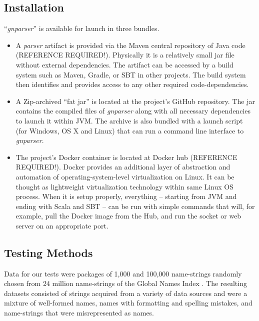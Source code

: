 \documentclass{bmcart}
\begin{document}
\subsection*{Installation}

``\textit{gnparser}'' is available for launch in three bundles.

\begin{itemize}
  \item A \textit{parser} artifact is provided via the Maven central repository of
    Java code (REFERENCE REQUIRED!). Physically it is a relatively small jar file without
    external dependencies. The artifact can be accessed by a build system such
    as Maven, Gradle, or SBT in other projects. The build system then
    identifies and provides access to any other required code-dependencies.

  \item A Zip-archived ``fat jar'' is located at the project's GitHub
    repository.  The jar contains the compiled files of \textit{gnparser} along
    with all necessary dependencies to launch it within JVM. The archive is
    also bundled with a launch script (for Windows, OS X and Linux) that can
    run a command line interface to \textit{gnparser}.

  \item The project's Docker container is located at Docker hub  (REFERENCE REQUIRED!).
    Docker provides an additional layer of abstraction and automation of
    operating-system-level virtualization on Linux. It can be thought as
    lightweight virtualization technology within same Linux OS process. When it
    is setup properly, everything -- starting from JVM and ending with Scala
    and SBT -- can be run with simple commands that will, for example,  pull
    the Docker image from the Hub, and run the socket or web server on an appropriate port.

\end{itemize}

\subsection*{Testing Methods}

Data for our tests were packages of 1,000 and 100,000 name-strings randomly chosen from
24 million name-strings of the Global Names Index \cite{gn:index}. The 
resulting datasets consisted of strings acquired from a variety of data sources
and were a mixture of well-formed names, names with formatting and spelling
mistakes, and name-strings that were misrepresented as names.
\end{document}
